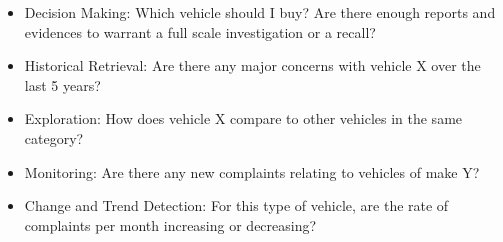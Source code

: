 \begin{itemize}[noitemsep]
   \item Decision Making: Which vehicle should I buy? Are there enough
   reports and evidences to warrant a full scale investigation or a recall?
   \item Historical Retrieval: Are there any major concerns with vehicle X over the last 5 years?
   \item Exploration: How does vehicle X compare to other vehicles in the same category?
   \item Monitoring: Are there any new complaints relating to vehicles of make Y?
   \item Change and Trend Detection: For this type of vehicle, are the rate of complaints per month increasing or decreasing?
\end{itemize}


